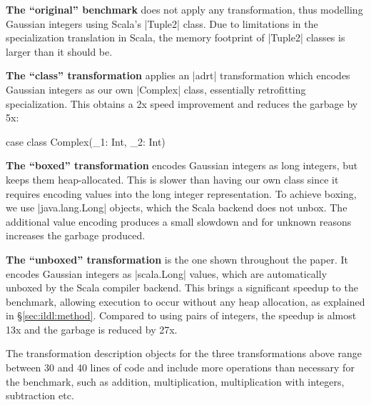 \vspace{0.5em}
\noindent
\textbf{The ``original'' benchmark} does not apply any transformation, thus modelling Gaussian integers using Scala's |Tuple2| class. Due to limitations in the specialization \cite{iuli-thesis, specialization-iuli} translation in Scala, the memory footprint of |Tuple2| classes is larger than it should be.

\vspace{0.5em}
\noindent
\textbf{The ``class'' transformation} applies an |adrt| transformation which encodes Gaussian integers as our own |Complex| class, essentially retrofitting specialization. This obtains a 2x speed improvement and reduces the garbage by 5x:

\begin{lstlisting-nobreak}
case class Complex(_1: Int, _2: Int)
\end{lstlisting-nobreak}

\vspace{0.5em}
\noindent
\textbf{The ``boxed'' transformation} encodes Gaussian integers as long integers, but keeps them heap-allocated. This is slower than having our own class since it requires encoding values into the long integer representation. To achieve boxing, we use |java.lang.Long| objects, which the Scala backend does not unbox. The additional value encoding produces a small slowdown and for unknown reasons increases the garbage produced.

\vspace{0.5em}
\noindent
\textbf{The ``unboxed'' transformation} is the one shown throughout the paper. It encodes Gaussian integers as |scala.Long| values, which are automatically unboxed by the Scala compiler backend. This brings a significant speedup to the benchmark, allowing execution to occur without any heap allocation, as explained in \S\ref{sec:ildl:method}. Compared to using pairs of integers, the speedup is almost 13x and the garbage is reduced by
27x.

\vspace{0.5em}
\noindent
The transformation description objects for the three transformations above range between 30 and 40 lines of code and include more operations than necessary for the benchmark, such as addition, multiplication, multiplication with integers, subtraction etc.

